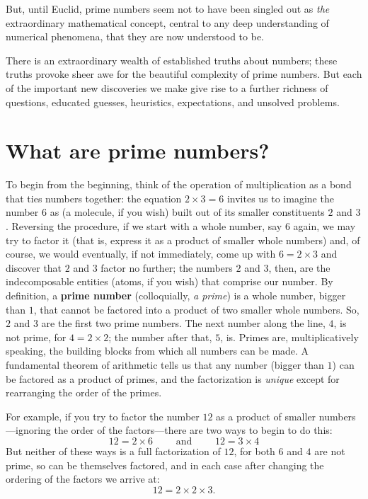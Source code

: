 \documentclass[11pt]{article}
\theoremstyle{plain}
\theoremstyle{definition}
\numberwithin{equation}{section}
\numberwithin{figure}{section}
\numberwithin{table}{section}
\begin{document}
\bigskip


But, until Euclid, prime numbers seem not to have been singled out as
{\em the} extraordinary mathematical concept, central to any deep
understanding of numerical phenomena, that they are now understood to
be.
       
\bigskip


There is an extraordinary wealth of established truths about numbers;
these truths provoke sheer awe for the beautiful complexity of prime
numbers. But each of the important new discoveries we make give rise
to a further richness of questions, educated guesses, heuristics,
expectations, and unsolved problems.
            
            \bigskip
            
\section{What are prime numbers?}
            

 To begin from the beginning, think
of the operation of multiplication as a bond that ties numbers
together: the equation $2\times 3= 6$ invites us to imagine the number
$6$ as (a molecule, if you wish) built out of its smaller constituents
$2$ and $3$.  Reversing the procedure, if we start with a whole
number, say $6$ again, we may try to factor it (that is, express it as
a product of smaller whole numbers) and, of course, we would
eventually, if not immediately, come up with $6 = 2\times 3$ and
discover that $2$ and $3$ factor no further; the numbers $2$ and $3$,
then, are the indecomposable entities (atoms, if you wish) that
comprise our number.  By definition, a {\bf prime number}
(colloquially, {\em a prime}) is a whole number, bigger than $1$, that
cannot be factored into a product of two smaller whole numbers. So,
$2$ and $3$ are the first two prime numbers. The next number along the
line, $4$, is not prime, for $4= 2\times 2$; the number after that,
$5$, is. Primes are, multiplicatively speaking, the building blocks
from which all numbers can be made. A fundamental theorem of
arithmetic tells us that any number (bigger than $1$) can be factored
as a product of primes, and the factorization is {\em unique} except
for rearranging the order of the primes. 

For example, if you try to factor the number $12$ as a product of
smaller numbers---ignoring the order of the factors---there are two
ways to begin to do this:
$$
  12 = 2 \times 6 \qquad\text{ and }\qquad   12 = 3 \times 4
$$
But neither of these ways is a full factorization of $12$, for both
$6$ and $4$ are not prime, so can be themselves factored, and in each
case after changing the ordering of the factors we arrive at:
$$
   12= 2 \times 2 \times 3.
$$
\end{document}
